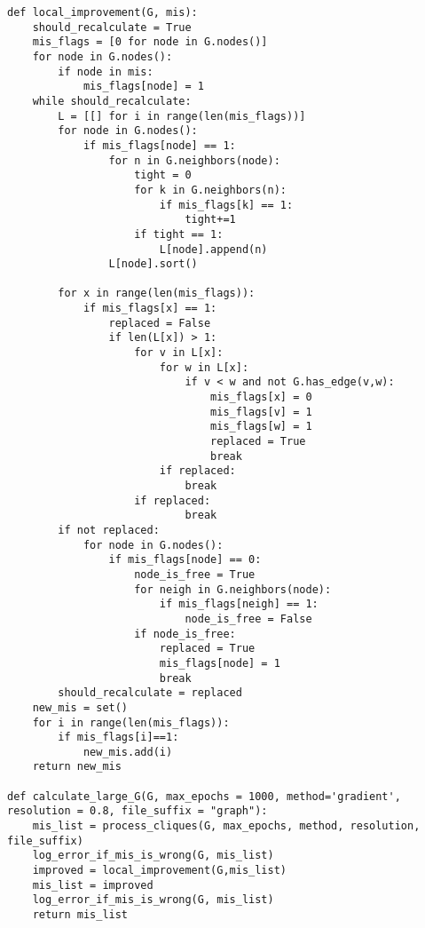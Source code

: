 \begin{lstlisting}
def local_improvement(G, mis):
    should_recalculate = True
    mis_flags = [0 for node in G.nodes()]
    for node in G.nodes():
        if node in mis:
            mis_flags[node] = 1
    while should_recalculate:
        L = [[] for i in range(len(mis_flags))]
        for node in G.nodes():
            if mis_flags[node] == 1:
                for n in G.neighbors(node):
                    tight = 0
                    for k in G.neighbors(n):
                        if mis_flags[k] == 1:
                            tight+=1
                    if tight == 1:
                        L[node].append(n)
                L[node].sort()
        
        for x in range(len(mis_flags)):
            if mis_flags[x] == 1:
                replaced = False
                if len(L[x]) > 1:
                    for v in L[x]:
                        for w in L[x]:
                            if v < w and not G.has_edge(v,w):
                                mis_flags[x] = 0
                                mis_flags[v] = 1
                                mis_flags[w] = 1
                                replaced = True
                                break
                        if replaced:
                            break
                    if replaced:
                            break
        if not replaced:
            for node in G.nodes():
                if mis_flags[node] == 0:
                    node_is_free = True
                    for neigh in G.neighbors(node):
                        if mis_flags[neigh] == 1:
                            node_is_free = False
                    if node_is_free:
                        replaced = True
                        mis_flags[node] = 1
                        break
        should_recalculate = replaced
    new_mis = set()
    for i in range(len(mis_flags)):
        if mis_flags[i]==1:
            new_mis.add(i)
    return new_mis
    
def calculate_large_G(G, max_epochs = 1000, method='gradient', resolution = 0.8, file_suffix = "graph"):
    mis_list = process_cliques(G, max_epochs, method, resolution, file_suffix)
    log_error_if_mis_is_wrong(G, mis_list)
    improved = local_improvement(G,mis_list)
    mis_list = improved
    log_error_if_mis_is_wrong(G, mis_list)
    return mis_list
\end{lstlisting}